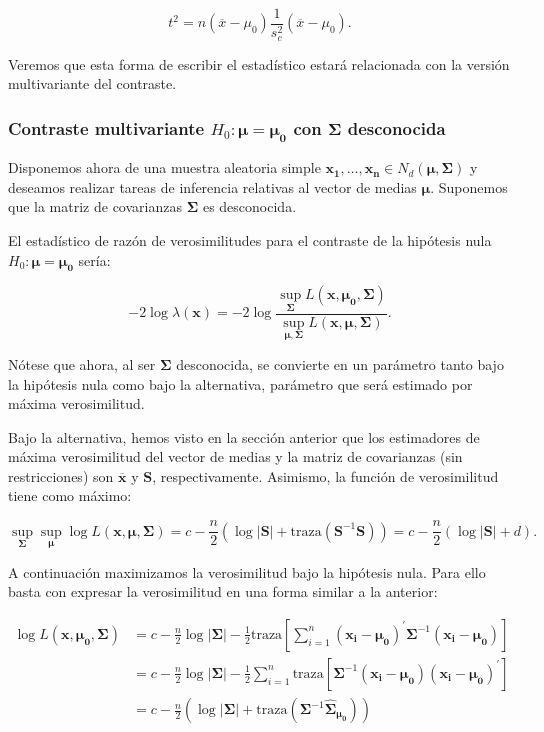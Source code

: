 \documentclass[
  a4paper,
  oneside]{scrbook}
\theoremstyle{definition}
\theoremstyle{definition}
\theoremstyle{definition}
\theoremstyle{definition}
\theoremstyle{remark}
\begin{document}
\begin{equation}
t^2=n(\overline{x}-\mu_0)\frac{1}{s_c^2}(\overline{x}-\mu_0).
\label{eq:t2}
\end{equation}

Veremos
que esta forma de escribir el estadístico estará relacionada con la
versión multivariante del contraste.

\subsubsection{\texorpdfstring{Contraste multivariante \(H_0:\bm\mu=\bm{\mu_0}\) con \(\bm\Sigma\) desconocida}{Contraste multivariante H\_0:\textbackslash bm\textbackslash mu=\textbackslash bm\{\textbackslash mu\_0\} con \textbackslash bm\textbackslash Sigma desconocida}}\label{contraste-multivariante-h-0-bm-mu-bm-mu-0-con-bm-sigma-desconocida}

Disponemos ahora de una muestra aleatoria simple \(\bm{x_1},\ldots,\bm{x_n}\in N_d(\bm{\bm{\mu}},\bm\Sigma)\) y deseamos
realizar tareas de inferencia relativas al vector de medias \(\bm{\mu}\).
Suponemos que la matriz de covarianzas \(\bm\Sigma\) es desconocida.

El estadístico de razón de verosimilitudes para el contraste de la
hipótesis nula \(H_0:\bm{\mu}=\bm{\mu_0}\) sería:

\[-2\log \lambda(\bm{x})
=-2\log \frac{\sup_{\bm\Sigma} L(\bm{x},\bm{\mu_0},\bm\Sigma)}{\sup_{\bm{\mu},\bm\Sigma} L(\bm{x},\bm{\mu},\bm\Sigma)}.\]

Nótese que ahora, al ser \(\bm\Sigma\) desconocida, se convierte en un
parámetro tanto bajo la hipótesis nula como bajo la alternativa,
parámetro que será estimado por máxima verosimilitud.

Bajo la alternativa, hemos visto en la sección anterior que los
estimadores de máxima verosimilitud del vector de medias y la matriz de
covarianzas (sin restricciones) son \(\overline{\bm{x}}\) y \(\bm{S}\),
respectivamente. Asimismo, la función de verosimilitud tiene como
máximo:

\[\sup_{\bm\Sigma}\sup_{\bm{\mu}}\log L(\bm{x},\bm{\mu},\bm\Sigma)
= c - \frac{n}{2}
\left( \log |\bm{S}| + \mbox{traza} \left( \bm{S}^{-1} \bm{S} \right)\right)
= c - \frac{n}{2} \left( \log |\bm{S}| + d\right).\]

A continuación maximizamos la verosimilitud bajo la hipótesis nula. Para
ello basta con expresar la verosimilitud en una forma similar a la
anterior:

\[\begin{aligned}
\log L(\bm{x},\bm{\mu_0},\bm\Sigma) &= c - \frac{n}{2} \log |\bm\Sigma|
-\frac{1}{2} \mbox{traza} \left[\sum_{i=1}^n
\left(\bm{x_i}-\bm{\mu_0}\right)^\prime{}\bm\Sigma^{-1} \left(\bm{x_i}-\bm{\mu_0}\right)\right] \\
&= c - \frac{n}{2} \log |\bm\Sigma|
-\frac{1}{2} \sum_{i=1}^n \mbox{traza}
\left[ \bm\Sigma^{-1} \left(\bm{x_i}-\bm{\mu_0}\right)  \left(\bm{x_i}-\bm{\mu_0}\right)^\prime{} \right] \\
&= c - \frac{n}{2} \left( \log |\bm\Sigma|
+ \mbox{traza} \left( \bm\Sigma^{-1} \hat{\bm\Sigma}_{\bm{\mu_0}} \right)\right)\end{aligned}\]
\end{document}
